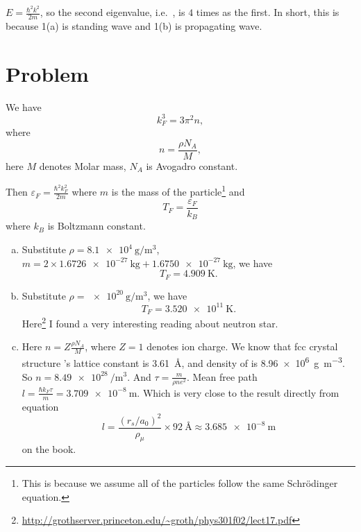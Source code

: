 \documentclass[12pt]{article}
\newcommand*{\RMN}[1]{\uppercase\expandafter{\romannumeral#1}}
\begin{document}
\begin{enumerate}[(a)]
	      $E= \frac{\hbar^2k^2}{2m}$, so the second eigenvalue, i.e.\ , is $4$ times as the first. In short, this is because 1(a) is standing wave and 1(b) is propagating wave.
\end{enumerate}


\section*{Problem \RMN{2}}
We have
\begin{equation}
	k_F^3 = 3 \pi^2 n,
\end{equation}
where
\begin{equation}
	n = \frac{\rho N_A}{M},
\end{equation}
here $M$ denotes Molar mass, $N_A$ is Avogadro constant.

Then $\varepsilon_F = \frac{\hbar^2 k_F^2}{2m}$ where $m$ is the mass of the particle\footnote{This is because we assume all of the
	particles follow the same Schr\"{o}dinger equation.} and
\begin{equation}
	T_F = \frac{\varepsilon_F}{ k_B}
\end{equation}
where $k_B$ is Boltzmann constant.

\begin{enumerate}[(a)]
	\item Substitute $\rho = \SI{8.1e4}{\gram\per\cubic\meter}$, $m=2\times \SI{1.6726e-27}{\kilogram} +\SI{1.6750e-27}{\kilogram}$, we have
	      \begin{equation}
	      	T_F = \SI{4.909}{\kelvin}.
	      \end{equation}
	\item Substitute $\rho = \SI{e20}{\gram\per\cubic\meter}$, we have
	      \begin{equation}
	      	T_F = \SI{3.520e11}{\kelvin}.
	      \end{equation}
	      Here\footnote{\url{http://grothserver.princeton.edu/~groth/phys301f02/lect17.pdf}} I found a very interesting reading about neutron star.
	\item Here $n = Z  \frac{\rho N_A}{M}$, where $Z=1$ denotes ion charge.
	      We know that fcc crystal structure 's lattice constant is \SI{3.61}{\angstrom}, and density of 
	      is \SI{8.96e6}{\gram\per\cubic\meter}. So $n= \SI{8.49e28}{\per\cubic\meter}$.
	      And $\tau =\frac{m}{\rho n e^2}$.
	      Mean free path $l = \frac{\hbar k_F \tau}{m} = \SI{3.709e-8}{\meter}$.
	      Which is very close to the result directly from equation
	      \begin{equation}
	      	l = \frac{(r_s/a_0)^2}{\rho_\mu}\times \SI{92}{\angstrom} \approx \SI{3.685e-8}{\meter}
	      \end{equation}
	      on the book.
\end{enumerate}
\end{document}
